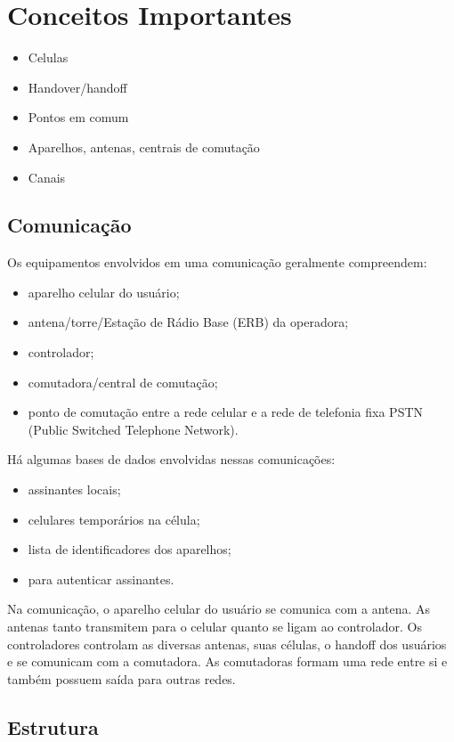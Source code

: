 \documentclass[11pt,oneside,a4paper]{abntex2}
\begin{document}
\section*{Conceitos Importantes}
\label{conceitos}

\begin{itemize}
	\item Celulas
	\item Handover/handoff
	\item Pontos em comum
	\item Aparelhos, antenas, centrais de comutação
	\item Canais
\end{itemize}

\subsection*{Comunicação}

Os equipamentos envolvidos em uma comunicação geralmente compreendem:
\begin{itemize}
	\item aparelho celular do usuário;
	\item antena/torre/Estação de Rádio Base (ERB) da operadora;
	\item controlador;
	\item comutadora/central de comutação;
	\item ponto de comutação entre a rede celular e a rede de telefonia fixa PSTN (Public Switched Telephone Network).
\end{itemize}

Há algumas bases de dados envolvidas nessas comunicações:
\begin{itemize}
	\item assinantes locais;
	\item celulares temporários na célula;
	\item lista de identificadores dos aparelhos;
	\item para autenticar assinantes.
\end{itemize}

Na comunicação, o aparelho celular do usuário se comunica com a antena. As antenas tanto transmitem para o celular quanto se ligam ao controlador. Os controladores controlam as diversas antenas, suas células, o handoff dos usuários e se comunicam com a comutadora. As comutadoras formam uma rede entre si e também possuem saída para outras redes.

\subsection*{Estrutura}
\end{document}
